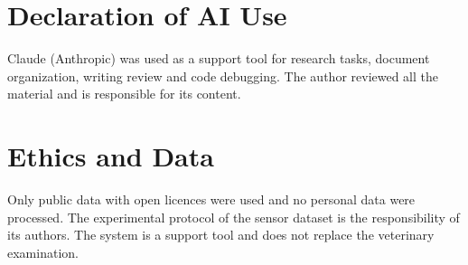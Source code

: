 \documentclass[conference,a4paper]{IEEEtran}
\begin{document}
\section*{Declaration of AI Use}

Claude (Anthropic) was used as a support tool for research tasks, document organization, writing review and code debugging. The author reviewed all the material and is responsible for its content.

\section*{Ethics and Data}

Only public data with open licences were used and no personal data were processed. The experimental protocol of the sensor dataset is the responsibility of its authors. The system is a support tool and does not replace the veterinary examination.
\end{document}
